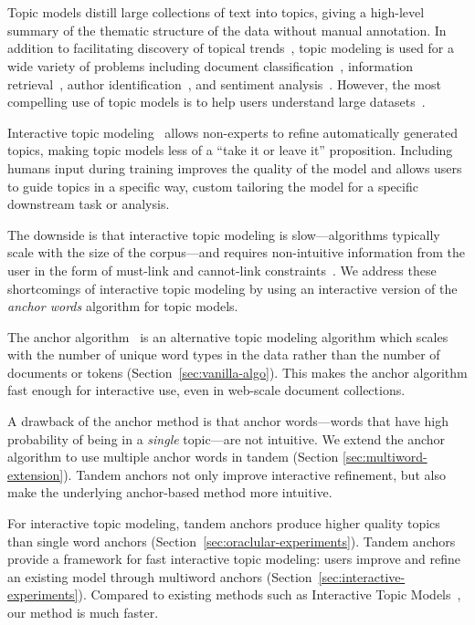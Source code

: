 \section*{}
\label{sec:intro}

Topic models distill large collections of text into topics,
giving a high-level summary of the thematic structure of the data without
manual annotation.
In addition to facilitating discovery of topical
trends~\cite{topical-guide}, topic modeling is used for a wide
variety of problems including
document classification~\cite{topic-classification},
information retrieval~\cite{lda-ir},
author identification~\cite{author-topic},
and sentiment analysis~\cite{topic-sentiment}.
However, the most compelling use of topic models is to help users understand
large datasets~\cite{termite}.

Interactive topic modeling~\cite{hu-14:itm} allows non-experts to refine
automatically generated topics, making topic models less of a ``take it or
leave it'' proposition.
Including humans input during training improves the quality of the
model and allows users to guide topics in a specific way, custom
tailoring the model for a specific downstream task or
analysis.

The downside is that interactive topic modeling is slow---algorithms typically
scale with the size of the corpus---and requires non-intuitive information from
the user in the form of must-link and cannot-link
constraints~\cite{andrzejewski-09}.
We address these shortcomings of interactive topic modeling by using an
interactive version of the \emph{anchor words} algorithm for topic models.

The anchor algorithm~\cite{anchors-practical} is an alternative topic modeling
algorithm which scales with the number of
unique word types in the data rather than the number of documents or tokens
(Section~\ref{sec:vanilla-algo}).
This makes the anchor algorithm fast enough for interactive use, even in
web-scale document collections.

A drawback of the anchor method is that anchor words---words that have high
probability of being in a \emph{single} topic---are not intuitive.
We extend the anchor algorithm to use multiple anchor words in tandem (Section
\ref{sec:multiword-extension}).
Tandem anchors not only improve interactive refinement, but also make the
underlying anchor-based method more intuitive.

For interactive topic modeling,
tandem anchors produce higher quality topics than single word anchors
(Section~\ref{sec:oraclular-experiments}).
Tandem anchors provide a framework for fast interactive topic modeling: users
improve and refine an existing model through multiword anchors
(Section~\ref{sec:interactive-experiments}).
Compared to existing methods such as Interactive Topic Models~\cite{hu-14:itm},
our method is much faster.
